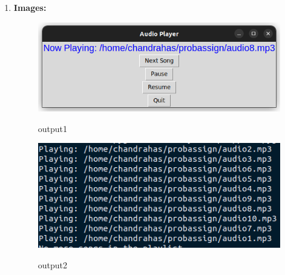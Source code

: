 \documentclass[12pt, journal]{IEEEtran}
\begin{document}
\begin{enumerate}[label=(\roman*)]
		\item \textbf{Images:}
			\begin{figure}[ht]
				\centering
				\includegraphics[scale=0.5]{images/1.png}
				\label{output1}
				
				\caption{output1}
			\end{figure}
			\begin{figure}[ht]
			        \centering
				\includegraphics[scale=0.5]{images/2.png}
				\label{output2}
				
				\caption{output2}
			\end{figure}
		\end{enumerate}		
\end{document}

